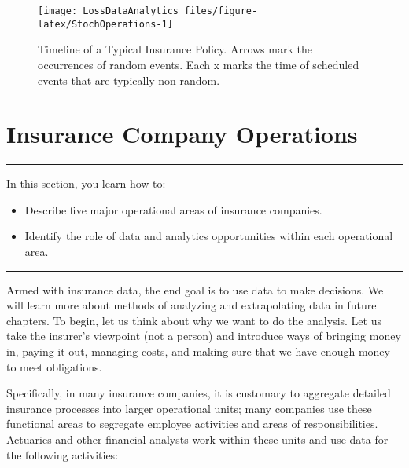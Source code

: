 \documentclass[]{book}
\providecommand{\tightlist}{%
  \setlength{\itemsep}{0pt}\setlength{\parskip}{0pt}}
\theoremstyle{definition}
\theoremstyle{definition}
\theoremstyle{definition}
\theoremstyle{remark}
\begin{document}
\begin{figure}

{\centering \texttt{[image: LossDataAnalytics\_files/figure-latex/StochOperations-1]} 

}

\caption{Timeline of a Typical Insurance Policy. Arrows
mark the occurrences of random events. Each x marks the time of
scheduled events that are typically non-random.}\label{fig:StochOperations}
\end{figure}

\section{Insurance Company Operations}\label{S:PredModApps}

\begin{center}\rule{0.5\linewidth}{\linethickness}\end{center}

In this section, you learn how to:

\begin{itemize}
\tightlist
\item
  Describe five major operational areas of insurance companies.
\item
  Identify the role of data and analytics opportunities within each
  operational area.
\end{itemize}

\begin{center}\rule{0.5\linewidth}{\linethickness}\end{center}

Armed with insurance data, the end goal is to use data to make
decisions. We will learn more about methods of analyzing and
extrapolating data in future chapters. To begin, let us think about why
we want to do the analysis. Let us take the insurer's viewpoint (not a
person) and introduce ways of bringing money in, paying it out, managing
costs, and making sure that we have enough money to meet obligations.

Specifically, in many insurance companies, it is customary to aggregate
detailed insurance processes into larger operational units; many
companies use these functional areas to segregate employee activities
and areas of responsibilities. Actuaries and other financial analysts
work within these units and use data for the following activities:
\end{document}
